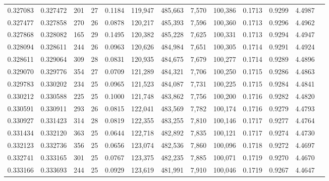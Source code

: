 \begin{tabular}{rrrrrrrrrrrrr}
0.327083 & 0.327472 & 201 &  27 &                                     0.1184 & 119,947 & 485,663 &   7,570 & 100,386 & 0.1713 & 0.9299 & 4.4987 \\
0.327477 & 0.327858 & 270 &  26 &                                     0.0878 & 120,217 & 485,393 &   7,596 & 100,360 & 0.1713 & 0.9296 & 4.4962 \\
0.327868 & 0.328082 & 165 &  29 &                                     0.1495 & 120,382 & 485,228 &   7,625 & 100,331 & 0.1713 & 0.9294 & 4.4947 \\
0.328094 & 0.328611 & 244 &  26 &                                     0.0963 & 120,626 & 484,984 &   7,651 & 100,305 & 0.1714 & 0.9291 & 4.4924 \\
0.328611 & 0.329064 & 309 &  28 &                                     0.0831 & 120,935 & 484,675 &   7,679 & 100,277 & 0.1714 & 0.9289 & 4.4896 \\
0.329070 & 0.329776 & 354 &  27 &                                     0.0709 & 121,289 & 484,321 &   7,706 & 100,250 & 0.1715 & 0.9286 & 4.4863 \\
0.329783 & 0.330202 & 234 &  25 &                                     0.0965 & 121,523 & 484,087 &   7,731 & 100,225 & 0.1715 & 0.9284 & 4.4841 \\
0.330212 & 0.330588 & 225 &  25 &                                     0.1000 & 121,748 & 483,862 &   7,756 & 100,200 & 0.1716 & 0.9282 & 4.4820 \\
0.330591 & 0.330911 & 293 &  26 &                                     0.0815 & 122,041 & 483,569 &   7,782 & 100,174 & 0.1716 & 0.9279 & 4.4793 \\
0.330927 & 0.331423 & 314 &  28 &                                     0.0819 & 122,355 & 483,255 &   7,810 & 100,146 & 0.1717 & 0.9277 & 4.4764 \\
0.331434 & 0.332120 & 363 &  25 &                                     0.0644 & 122,718 & 482,892 &   7,835 & 100,121 & 0.1717 & 0.9274 & 4.4730 \\
0.332123 & 0.332736 & 356 &  25 &                                     0.0656 & 123,074 & 482,536 &   7,860 & 100,096 & 0.1718 & 0.9272 & 4.4697 \\
0.332741 & 0.333165 & 301 &  25 &                                     0.0767 & 123,375 & 482,235 &   7,885 & 100,071 & 0.1719 & 0.9270 & 4.4670 \\
0.333166 & 0.333693 & 244 &  25 &                                     0.0929 & 123,619 & 481,991 &   7,910 & 100,046 & 0.1719 & 0.9267 & 4.4647 \\

\end{tabular}
